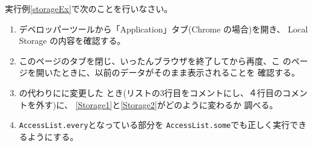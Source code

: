  \begin{Prob}\upshape
	実行例\ref{storageEx}で次のことを行いなさい。
	\begin{enumerate}
	 \item \Must デベロッパーツールから「Application」タブ(Chrome の場合)を開き、
				 Local Storage の内容を確認する。\label{Storage1}
				 \ifText\\[0.05\textheight]\fi
	 \item \Must このページのタブを閉じ、いったんブラウザを終了してから再度、こ
				 のページを開いたときに、以前のデータがそのまま表示されることを
				 確認する。\label{Storage2}\ifText\\[0.05\textheight]\fi
	 \item \Must {} の代わりにに変更した
				 とき(リストの3行目をコメントにし、４行目のコメントを外す)に、
				 \ref{Storage1}と\ref{Storage2}がどのように変わるか
				 調べる。\ifText\\[0.05\textheight]\fi
	 \item \Verb+AccessList.every+となっている部分を
	\Verb+AccessList.some+でも正しく実行できるようにする。\ifText\\[0.05\textheight]\fi
	\end{enumerate}
\end{Prob}
